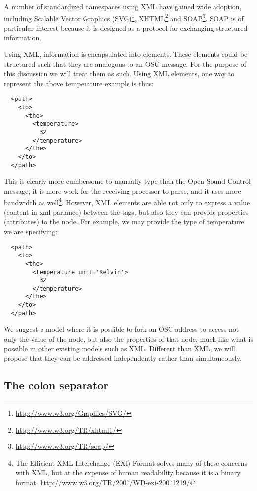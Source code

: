 \documentclass{sig-alternate}
\begin{document}
A number of standardized namespaces using XML have gained wide adoption, including Scalable Vector Graphics (SVG)\footnote{\url{http://www.w3.org/Graphics/SVG/}}, XHTML\footnote{\url{http://www.w3.org/TR/xhtml1/}} and SOAP\footnote{\url{http://www.w3.org/TR/soap/}}.  SOAP is of particular interest because it is designed as a protocol for exchanging structured information.

Using XML, information is encapsulated into elements.  These elements could be structured such that they are analogous to an OSC message. For the purpose of this discussion we will treat them as such.  Using XML elements, one way to represent the above temperature example is thus:

\begin{lstlisting}
  <path>
    <to>
      <the>
        <temperature> 
          32
        </temperature>
      </the>
    </to>
  </path>
\end{lstlisting}

This is clearly more cumbersome to manually type than the Open Sound Control message, it is more work for the receiving processor to parse, and it uses more bandwidth as well\footnote{The Efficient XML Interchange (EXI) Format solves many of these concerns with XML, but at the expense of human readability because it is a binary format.  http://www.w3.org/TR/2007/WD-exi-20071219/ }. However, XML elements are able not only to express a value (content in xml parlance) between the tags, but also they can provide properties (attributes) to the node. For example, we may provide the type of temperature we are specifying:

\begin{lstlisting}
  <path>
    <to>
      <the>
        <temperature unit='Kelvin'>
          32
        </temperature>
      </the>
    </to>
  </path>
\end{lstlisting}

We suggest a model where it is possible to fork an OSC address to access not only the value of the node, but also the properties of that node, much like what is possible in other existing models such as XML.  Different than XML, we will propose that they can be addressed independently rather than simultaneously.


\subsection{The colon separator} %
\label{sub:the_colon_separator}
\end{document}
